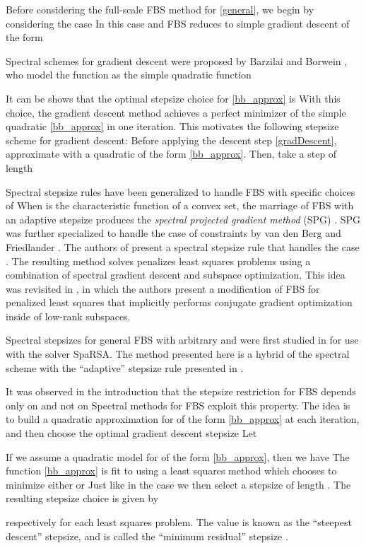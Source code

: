 \documentclass{amsart}
\newcommand{\aln}[1]{}
\newcommand{\ra}{\rangle}
\newcommand{\la}{\langle}
\newcommand{\kp}{^{k+1}}
\newcommand{\km}{^{k-1}}
\theoremstyle{definition}
\begin{document}
Before considering the full-scale FBS method for \eqref{general}, we begin by considering the case   In this case  and FBS reduces to simple gradient descent of the form
 \aln{x\kp = x^k-\tau^k \nabla f(x). \label{gradDescent}} 
     Spectral schemes for gradient descent were proposed by Barzilai and Borwein \cite{BB88}, who model the function  as the simple quadratic function 
 \aln{ \label {bb_approx} f(x)   \approx   \hat f(x) =  \frac{a}{2} \|x\|^2+\la x , b \ra.}
 It can be shows that the optimal stepsize choice for \eqref{bb_approx} is   With this choice, the gradient descent method achieves a perfect minimizer of the simple quadratic \eqref{bb_approx} in one iteration.  This motivates the following stepsize scheme for gradient descent:  Before applying the descent step \eqref{gradDescent}, approximate  with a quadratic of the form \eqref{bb_approx}.  Then, take a step of length 


Spectral stepsize rules have been generalized to handle FBS with specific choices of    When  is the characteristic function of a convex set, the marriage of FBS with an adaptive stepsize produces the {\em spectral projected gradient method} (SPG) \cite{BMR00}.  SPG was further specialized to handle the case of  constraints by  van den Berg and Friedlander \cite{VF07,VF08}.  The authors of \cite{WYG10} present a spectral stepsize rule that handles the case .  The resulting method solves  penalizes least squares problems using a combination of spectral gradient descent and subspace optimization.  This idea was revisited in \cite{GS10}, in which the authors present a modification of FBS for  penalized least squares that implicitly performs conjugate gradient optimization inside of low-rank subspaces. 

Spectral stepsizes for general FBS with arbitrary  and  were first studied in \cite{WNF09} for use with the solver SpaRSA.  The method presented here is a hybrid of the spectral scheme \cite{WNF09} with the ``adaptive'' stepsize rule presented in \cite{ZGD06}.

It was observed in the introduction that the stepsize restriction for FBS depends only on  and not on   Spectral methods for FBS exploit this property.  The idea is to build a quadratic approximation for  of the form \eqref{bb_approx} at each iteration, and then choose the optimal gradient descent stepsize      Let 
  \aln{
  \Delta x^k &= x^k - x\km, \\
   \Delta F^k &= \nabla f (x^k) - \nabla f(x\km). 
  }
 If we assume a quadratic model for  of the form \eqref{bb_approx}, then we have   The function \eqref{bb_approx} is fit to  using a least squares method which chooses  to minimize either  or  Just like in the case  we then select a stepsize of length .  The resulting stepsize choice is given by  
  \aln{ \label{bbRules}
   \tau_s^k &=\frac{ \la   \Delta x^k, \Delta x^k \ra}{\la   \Delta x^k, \Delta F^k \ra},\text{ and }  \tau_m^k =\frac{\la   \Delta x^k, \Delta F^k \ra} { \la   \Delta F^k, \Delta F^k \ra}
   }  
respectively for each least squares problem.  The value  is known as the ``steepest descent'' stepsize, and   is called the ``minimum residual'' stepsize \cite{ZGD06}.
\end{document}
